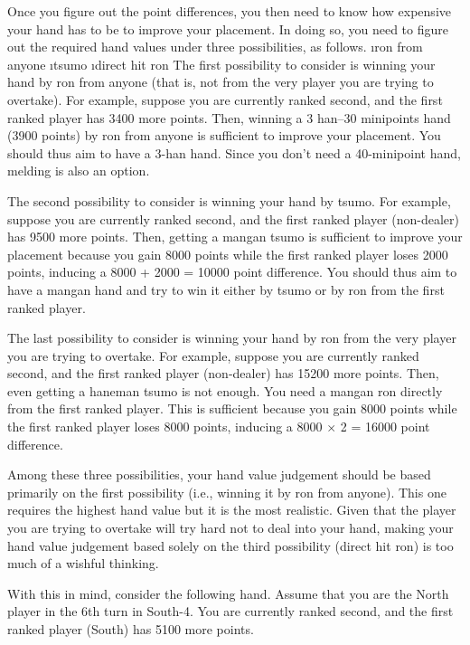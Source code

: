 \bigskip
Once you figure out the point differences, you then need to know how expensive your hand has to be to improve your placement. In doing so, you need to figure out the required hand values under three possibilities, as follows.
\be
\i {\jap ron} from anyone
\i {\jap tsumo}
\i direct hit {\jap ron}
\ee
The first possibility to consider is winning your hand by {\jap ron} from anyone (that is, not from the very player you are trying to overtake). For example, suppose you are currently ranked second, and the first ranked player has 3400 more points. Then, winning a 3 {\jap han}--30 minipoints hand (3900 points) by {\jap ron} from anyone is sufficient to improve your placement. You should thus aim to have a 3-{\jap han} hand. Since you don't need a 40-minipoint hand, melding is also an option. 

\bigskip
The second possibility to consider is winning your hand by {\jap tsumo}. For example, suppose you are currently ranked second, and the first ranked player (non-dealer) has 9500 more points. Then, getting a {\jap mangan tsumo} is sufficient to improve your placement because you gain 8000 points while the first ranked player loses 2000 points, inducing a 8000 + 2000 = 10000 point difference. You should thus aim to have a {\jap mangan} hand and try to win it either by {\jap tsumo} or by {\jap ron} from the first ranked player. 

\bigskip
The last possibility to consider is winning your hand by {\jap ron} from the very player you are trying to overtake. For example, suppose you are currently ranked second, and the first ranked player (non-dealer) has 15200 more points. Then, even getting a {\jap haneman tsumo} is not enough. You need a {\jap mangan ron} directly from the first ranked player. This is sufficient because you gain 8000 points while the first ranked player loses 8000 points, inducing a 8000 $\times$ 2 = 16000 point difference. 

\bigskip
Among these three possibilities, your hand value judgement should be based primarily on the first possibility (i.e., winning it by {\jap ron} from anyone). This one requires the highest hand value but it is the most realistic. Given that the player you are trying to overtake will try hard not to deal into your hand, making your hand value judgement based solely on the third possibility (direct hit {\jap ron}) is too much of a wishful thinking. 

\bigskip
With this in mind, consider the following hand. Assume that you are the North player in the 6th turn in South-4. You are currently ranked second, and the first ranked player (South) has 5100 more points. 

